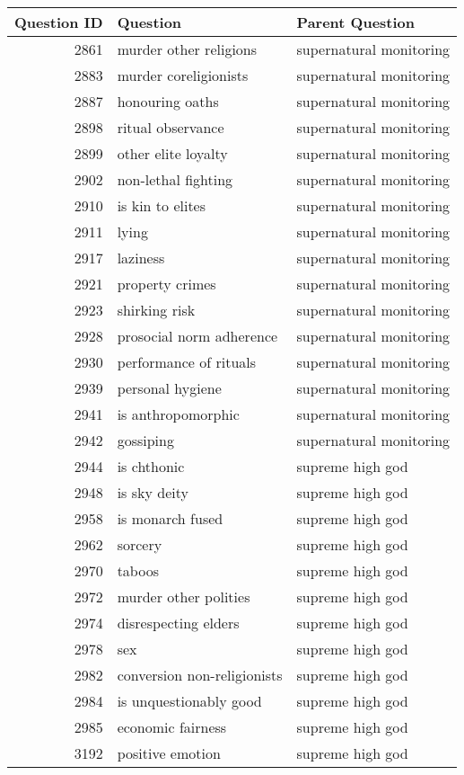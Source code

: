 \begin{tabular}{rll}
\toprule
Question ID & Question & Parent Question \\
\midrule
2861 & murder other religions & supernatural monitoring \\
2883 & murder coreligionists & supernatural monitoring \\
2887 & honouring oaths & supernatural monitoring \\
2898 & ritual observance & supernatural monitoring \\
2899 & other elite loyalty & supernatural monitoring \\
2902 & non-lethal fighting & supernatural monitoring \\
2910 & is kin to elites & supernatural monitoring \\
2911 & lying & supernatural monitoring \\
2917 & laziness & supernatural monitoring \\
2921 & property crimes & supernatural monitoring \\
2923 & shirking risk & supernatural monitoring \\
2928 & prosocial norm adherence & supernatural monitoring \\
2930 & performance of rituals & supernatural monitoring \\
2939 & personal hygiene & supernatural monitoring \\
2941 & is anthropomorphic & supernatural monitoring \\
2942 & gossiping & supernatural monitoring \\
2944 & is chthonic & supreme high god \\
2948 & is sky deity & supreme high god \\
2958 & is monarch fused & supreme high god \\
2962 & sorcery & supreme high god \\
2970 & taboos & supreme high god \\
2972 & murder other polities & supreme high god \\
2974 & disrespecting elders & supreme high god \\
2978 & sex & supreme high god \\
2982 & conversion non-religionists & supreme high god \\
2984 & is unquestionably good & supreme high god \\
2985 & economic fairness & supreme high god \\
3192 & positive emotion & supreme high god \\

\end{tabular}
